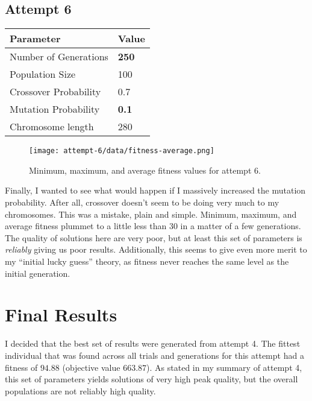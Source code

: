 \documentclass[12pt, letterpaper]{article}
\begin{document}
\subsection{Attempt 6}
\begin{center}
\begin{tabular}{p{} l}
    \toprule
    \textbf{Parameter}      & \textbf{Value}    \\ \midrule
    Number of Generations   & \textbf{250}      \\
    Population Size         & 100               \\
    Crossover Probability   & 0.7               \\
    Mutation Probability    & \textbf{0.1}      \\ 
    Chromosome length       & 280               \\ \bottomrule
\end{tabular}
\end{center}

\begin{figure}[H]
    \centerline{\texttt{[image: attempt-6/data/fitness-average.png]}}
    \caption{Minimum, maximum, and average fitness values for attempt 6.}\label{Fig:Attempt6Fitness}
\end{figure}

Finally, I wanted to see what would happen if I massively increased the mutation probability.
After all, crossover doesn't seem to be doing very much to my chromosomes.
This was a mistake, plain and simple.
Minimum, maximum, and average fitness plummet to a little less than 30 in a matter of a few generations.
The quality of solutions here are very poor, but at least this set of parameters is \textit{reliably} giving us poor results.
Additionally, this seems to give even more merit to my ``initial lucky guess'' theory,
as fitness never reaches the same level as the initial generation.

\section{Final Results}

I decided that the best set of results were generated from attempt 4.
The fittest individual that was found across all trials and generations for this attempt
had a fitness of $94.88$ (objective value $663.87$).
As stated in my summary of attempt 4, this set of parameters yields solutions of very high peak quality,
but the overall populations are not reliably high quality.
\end{document}
